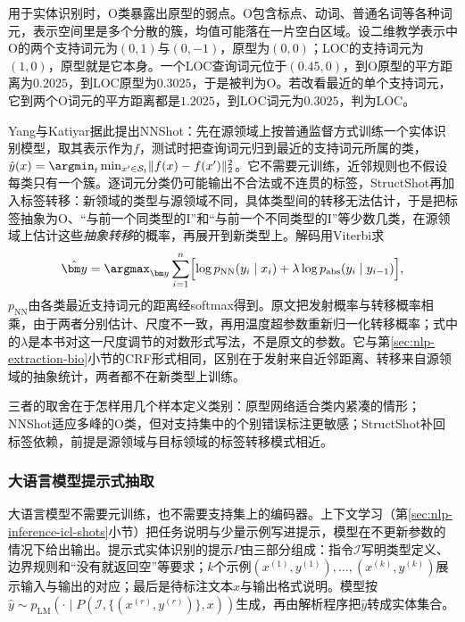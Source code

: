 用于实体识别时，O类暴露出原型的弱点。O包含标点、动词、普通名词等各种词元，表示空间里是多个分散的簇，均值可能落在一片空白区域。设二维教学表示中O的两个支持词元为$(0,1)$与$(0,-1)$，原型为$(0,0)$；LOC的支持词元为$(1,0)$，原型就是它本身。一个LOC查询词元位于$(0.45,0)$，到O原型的平方距离为$0.2025$，到LOC原型为$0.3025$，于是被判为O。若改看最近的单个支持词元，它到两个O词元的平方距离都是$1.2025$，到LOC词元为$0.3025$，判为LOC。

Yang与Katiyar据此提出NNShot：先在源领域上按普通监督方式训练一个实体识别模型，取其表示作为$f$，测试时把查询词元归到最近的支持词元所属的类，$\hat y(x)=\argmin_t\min_{x'\in\mathcal S_t}\lVert f(x)-f(x')\rVert_2^2$。它不需要元训练，近邻规则也不假设每类只有一个簇。逐词元分类仍可能输出不合法或不连贯的标签，StructShot再加入标签转移：新领域的类型与源领域不同，具体类型间的转移无法估计，于是把标签抽象为O、“与前一个同类型的I”和“与前一个不同类型的I”等少数几类，在源领域上估计这些\emph{抽象转移}的概率，再展开到新类型上。解码用Viterbi求
\begin{equation}
  \hat{\bm y}=\argmax_{\bm y}\sum_{i=1}^{n}\Bigl[\log p_{\mathrm{NN}}(y_i\mid x_i)+\lambda\log p_{\mathrm{abs}}(y_i\mid y_{i-1})\Bigr],
  \label{eq:nlp-extraction-structshot}
\end{equation}
$p_{\mathrm{NN}}$由各类最近支持词元的距离经softmax得到。原文把发射概率与转移概率相乘，由于两者分别估计、尺度不一致，再用温度超参数重新归一化转移概率；式中的$\lambda$是本书对这一尺度调节的对数形式写法，不是原文的参数。它与第\ref{sec:nlp-extraction-bio}小节的CRF形式相同，区别在于发射来自近邻距离、转移来自源领域的抽象统计，两者都不在新类型上训练。

三者的取舍在于怎样用几个样本定义类别：原型网络适合类内紧凑的情形；NNShot适应多峰的O类，但对支持集中的个别错误标注更敏感；StructShot补回标签依赖，前提是源领域与目标领域的标签转移模式相近。

\subsubsection{大语言模型提示式抽取}
\label{sec:nlp-extraction-llm-ner}

大语言模型不需要元训练，也不需要支持集上的编码器。上下文学习（第\ref{sec:nlp-inference-icl-shots}小节）把任务说明与少量示例写进提示，模型在不更新参数的情况下给出输出。提示式实体识别的提示$P$由三部分组成：指令$\mathcal I$写明类型定义、边界规则和“没有就返回空”等要求；$k$个示例$(x^{(1)},y^{(1)}),\ldots,(x^{(k)},y^{(k)})$展示输入与输出的对应；最后是待标注文本$x$与输出格式说明。模型按$\hat y\sim p_{\mathrm{LM}}(\cdot\mid P(\mathcal I,\{(x^{(r)},y^{(r)})\},x))$生成，再由解析程序把$\hat y$转成实体集合。

